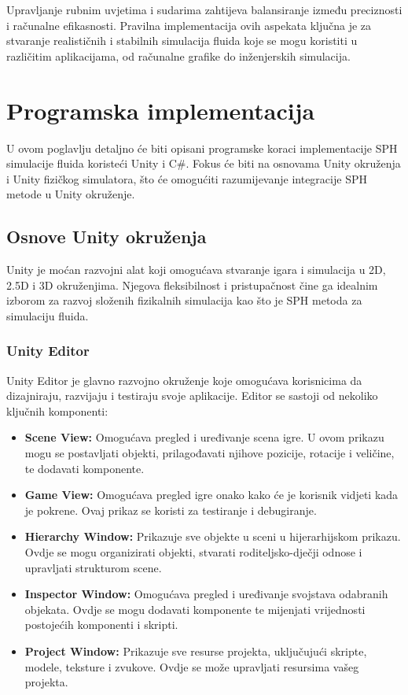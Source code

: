 \documentclass[diplomskirad]{fer}
\begin{document}
\begin{itemize}
        Upravljanje rubnim uvjetima i sudarima zahtijeva balansiranje između preciznosti i računalne efikasnosti.
        Pravilna implementacija ovih aspekata ključna je za stvaranje realističnih i stabilnih simulacija fluida koje se mogu koristiti u različitim aplikacijama, od računalne grafike do inženjerskih simulacija.


    \end{itemize}


    \chapter{Programska implementacija}\label{ch:programska-implementacija}

    U ovom poglavlju detaljno će biti opisani programske koraci implementacije SPH simulacije fluida koristeći Unity i C\#.
    Fokus će biti na osnovama Unity okruženja i Unity fizičkog simulatora, što će omogućiti razumijevanje integracije SPH metode u Unity okruženje.

    \section{Osnove Unity okruženja}\label{sec:osnove-unity-okruzenja}

    Unity je moćan razvojni alat koji omogućava stvaranje igara i simulacija u 2D, 2.5D i 3D okruženjima. Njegova fleksibilnost i pristupačnost čine ga idealnim izborom za razvoj složenih fizikalnih simulacija kao što je SPH metoda za simulaciju fluida.

    \subsection{Unity Editor}\label{subsec:unity-editor}
    Unity Editor je glavno razvojno okruženje koje omogućava korisnicima da dizajniraju, razvijaju i testiraju svoje aplikacije.
    Editor se sastoji od nekoliko ključnih komponenti:
    \begin{itemize}
        \item \textbf{Scene View:} Omogućava pregled i uređivanje scena igre.
        U ovom prikazu mogu se postavljati objekti, prilagođavati njihove pozicije, rotacije i veličine, te dodavati komponente.
        \item \textbf{Game View:} Omogućava pregled igre onako kako će je korisnik vidjeti kada je pokrene.
        Ovaj prikaz se koristi za testiranje i debugiranje.
        \item \textbf{Hierarchy Window:} Prikazuje sve objekte u sceni u hijerarhijskom prikazu.
        Ovdje se mogu organizirati objekti, stvarati roditeljsko-dječji odnose i upravljati strukturom scene.
        \item \textbf{Inspector Window:} Omogućava pregled i uređivanje svojstava odabranih objekata.
        Ovdje se mogu dodavati komponente te mijenjati vrijednosti postojećih komponenti i skripti.
        \item \textbf{Project Window:} Prikazuje sve resurse projekta, uključujući skripte, modele, teksture i zvukove.
        Ovdje se može upravljati resursima vašeg projekta.
    \end{itemize}
\end{document}
